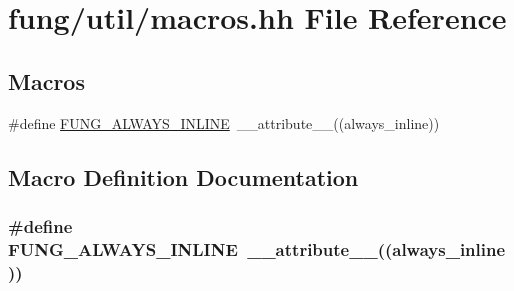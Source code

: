 \hypertarget{macros_8hh}{\section{fung/util/macros.hh File Reference}
\label{macros_8hh}
}
\subsection*{Macros}
\begin{DoxyCompactItemize}
\item 
\#define \hyperlink{macros_8hh_a03b9da186125795e5afa49d0ef1cc32f}{F\-U\-N\-G\-\_\-\-A\-L\-W\-A\-Y\-S\-\_\-\-I\-N\-L\-I\-N\-E}~\-\_\-\-\_\-attribute\-\_\-\-\_\-((always\-\_\-inline))
\end{DoxyCompactItemize}


\subsection{Macro Definition Documentation}
\hypertarget{macros_8hh_a03b9da186125795e5afa49d0ef1cc32f}{
\subsubsection[{F\-U\-N\-G\-\_\-\-A\-L\-W\-A\-Y\-S\-\_\-\-I\-N\-L\-I\-N\-E}]{\setlength{\rightskip}{0pt plus 5cm}\#define F\-U\-N\-G\-\_\-\-A\-L\-W\-A\-Y\-S\-\_\-\-I\-N\-L\-I\-N\-E~\-\_\-\-\_\-attribute\-\_\-\-\_\-((always\-\_\-inline))}}\label{macros_8hh_a03b9da186125795e5afa49d0ef1cc32f}
